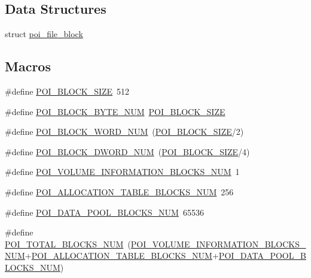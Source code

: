 \subsection*{Data Structures}
\begin{DoxyCompactItemize}
\item 
struct \hyperlink{structpoi__file__block}{poi\-\_\-file\-\_\-block}
\end{DoxyCompactItemize}
\subsection*{Macros}
\begin{DoxyCompactItemize}
\item 
\#define \hyperlink{file-manager_8h_afb59af7070cf0cd010913eef940ffbbd}{P\-O\-I\-\_\-\-B\-L\-O\-C\-K\-\_\-\-S\-I\-Z\-E}~512
\item 
\#define \hyperlink{file-manager_8h_ab4ee8ff3b1aa134fa74304c47f767131}{P\-O\-I\-\_\-\-B\-L\-O\-C\-K\-\_\-\-B\-Y\-T\-E\-\_\-\-N\-U\-M}~\hyperlink{file-manager_8h_afb59af7070cf0cd010913eef940ffbbd}{P\-O\-I\-\_\-\-B\-L\-O\-C\-K\-\_\-\-S\-I\-Z\-E}
\item 
\#define \hyperlink{file-manager_8h_a1323091f8cdc771e2fc912aa8168bd39}{P\-O\-I\-\_\-\-B\-L\-O\-C\-K\-\_\-\-W\-O\-R\-D\-\_\-\-N\-U\-M}~(\hyperlink{file-manager_8h_afb59af7070cf0cd010913eef940ffbbd}{P\-O\-I\-\_\-\-B\-L\-O\-C\-K\-\_\-\-S\-I\-Z\-E}/2)
\item 
\#define \hyperlink{file-manager_8h_a6a84ee9ea421e70befc839ad31498909}{P\-O\-I\-\_\-\-B\-L\-O\-C\-K\-\_\-\-D\-W\-O\-R\-D\-\_\-\-N\-U\-M}~(\hyperlink{file-manager_8h_afb59af7070cf0cd010913eef940ffbbd}{P\-O\-I\-\_\-\-B\-L\-O\-C\-K\-\_\-\-S\-I\-Z\-E}/4)
\item 
\#define \hyperlink{file-manager_8h_a87ede160157563bbccc56097d4c431d7}{P\-O\-I\-\_\-\-V\-O\-L\-U\-M\-E\-\_\-\-I\-N\-F\-O\-R\-M\-A\-T\-I\-O\-N\-\_\-\-B\-L\-O\-C\-K\-S\-\_\-\-N\-U\-M}~1
\item 
\#define \hyperlink{file-manager_8h_a555a4a22088989bb446cc085f19844ec}{P\-O\-I\-\_\-\-A\-L\-L\-O\-C\-A\-T\-I\-O\-N\-\_\-\-T\-A\-B\-L\-E\-\_\-\-B\-L\-O\-C\-K\-S\-\_\-\-N\-U\-M}~256
\item 
\#define \hyperlink{file-manager_8h_a6e4b52d19d492676f83a8576aba19a34}{P\-O\-I\-\_\-\-D\-A\-T\-A\-\_\-\-P\-O\-O\-L\-\_\-\-B\-L\-O\-C\-K\-S\-\_\-\-N\-U\-M}~65536
\item 
\#define \hyperlink{file-manager_8h_aab5f281daf18993acf5f25ae7fecef0d}{P\-O\-I\-\_\-\-T\-O\-T\-A\-L\-\_\-\-B\-L\-O\-C\-K\-S\-\_\-\-N\-U\-M}~(\hyperlink{file-manager_8h_a87ede160157563bbccc56097d4c431d7}{P\-O\-I\-\_\-\-V\-O\-L\-U\-M\-E\-\_\-\-I\-N\-F\-O\-R\-M\-A\-T\-I\-O\-N\-\_\-\-B\-L\-O\-C\-K\-S\-\_\-\-N\-U\-M}+\hyperlink{file-manager_8h_a555a4a22088989bb446cc085f19844ec}{P\-O\-I\-\_\-\-A\-L\-L\-O\-C\-A\-T\-I\-O\-N\-\_\-\-T\-A\-B\-L\-E\-\_\-\-B\-L\-O\-C\-K\-S\-\_\-\-N\-U\-M}+\hyperlink{file-manager_8h_a6e4b52d19d492676f83a8576aba19a34}{P\-O\-I\-\_\-\-D\-A\-T\-A\-\_\-\-P\-O\-O\-L\-\_\-\-B\-L\-O\-C\-K\-S\-\_\-\-N\-U\-M})

\end{DoxyCompactItemize}
